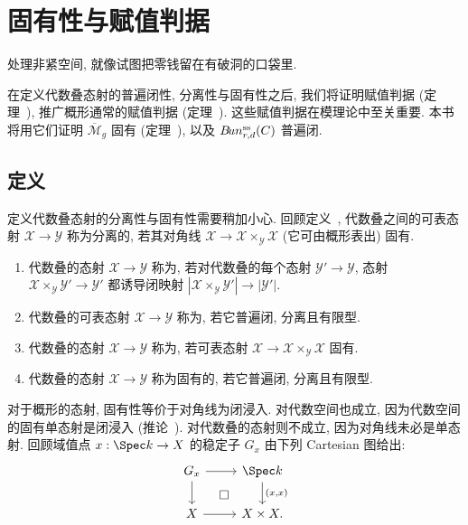 \section{固有性与赋值判据}\label{src:4.8}
\begin{epigraph}
处理非紧空间, 就像试图把零钱留在有破洞的口袋里.
\end{epigraph}
在定义代数叠态射的普遍闭性, 分离性与固有性之后, 我们将证明赋值判据 (定理~), 推广概形通常的赋值判据 (定理~). 这些赋值判据在模理论中至关重要. 本书将用它们证明 $\overline{\mathcal M}_g$ 固有 (定理~), 以及 $B\!un^{\mathrm{ss}}_{r,d}(C)$ 普遍闭.

\subsection{定义}\label{src:4.8.1-subsection}
定义代数叠态射的分离性与固有性需要稍加小心. 回顾定义~, 代数叠之间的可表态射 $\mathcal X\to\mathcal Y$ 称为分离的, 若其对角线 $\mathcal X\to\mathcal X\times_{\mathcal Y}\mathcal X$ (它可由概形表出) 固有.
\begin{definition}\label{src:4.8.1}
\begin{enumerate}[(1)]
\item 代数叠的态射 $\mathcal X\to\mathcal Y$ 称为, 若对代数叠的每个态射 $\mathcal Y'\to\mathcal Y$, 态射 $\mathcal X\times_{\mathcal Y}\mathcal Y'\to\mathcal Y'$ 都诱导闭映射 $|\mathcal X\times_{\mathcal Y}\mathcal Y'|\to|\mathcal Y'|$.
\item 代数叠的可表态射 $\mathcal X\to\mathcal Y$ 称为, 若它普遍闭, 分离且有限型.
\item 代数叠的态射 $\mathcal X\to\mathcal Y$ 称为, 若可表态射 $\mathcal X\to\mathcal X\times_{\mathcal Y}\mathcal X$ 固有.
\item 代数叠的态射 $\mathcal X\to\mathcal Y$ 称为固有的, 若它普遍闭, 分离且有限型.
\end{enumerate}
\end{definition}
对于概形的态射, 固有性等价于对角线为闭浸入. 对代数空间也成立, 因为代数空间的固有单态射是闭浸入 (推论~). 对代数叠的态射则不成立, 因为对角线未必是单态射. 回顾域值点 $x:\Spec k\to\mathcal X$ 的稳定子 $G_x$ 由下列 Cartesian 图给出:
\[
\begin{tikzcd}
G_x\arrow[r]\arrow[d]&\Spec k\arrow[d,"{(x,x)}"]\\
\mathcal X\arrow[r]\arrow[ur,phantom,"\square" description]&\mathcal X\times\mathcal X.
\end{tikzcd}
\]
